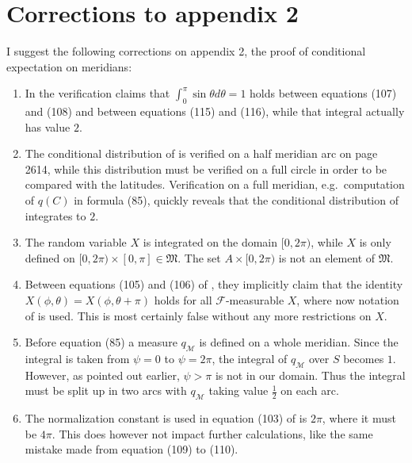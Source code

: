 \documentclass[a4paper]{report}
\theoremstyle{plain}
\theoremstyle{definition}
\theoremstyle{remark}
\numberwithin{equation}{chapter}
\DeclareMathOperator{\1}{\mathbbm{1}}
\newcommand{\F}{\mathcal{F}}
\begin{document}
\section{Corrections to appendix 2}\label{app:CorMer}
I suggest the following corrections on appendix 2, the proof of conditional expectation on meridians:
\begin{enumerate}
\item In the verification \cite{Gyenis17} claims that $\int_0^\pi\sin\theta d\theta=1$ holds between equations (107) and (108) and between equations (115) and (116), while that integral actually has value $2$.
\item The conditional distribution of \cite{Gyenis17} is verified on a half meridian arc on page 2614, while this distribution must be verified on a full circle in order to be compared with the latitudes. Verification on a full meridian, e.g.~computation of $q(C)$ in formula (85), quickly reveals that the conditional distribution of \cite{Gyenis17} integrates to $2$.
\item The random variable $X$ is integrated on the domain $[0,2\pi)$, while $X$ is only defined on $[0,2\pi)\times[0,\pi]\in\mathfrak{M}$. The set $A\times[0,2\pi)$ is not an element of $\mathfrak{M}$.
\item Between equations (105) and (106) of \cite{Gyenis17}, they implicitly claim that the identity $X(\phi,\theta)=X(\phi,\theta+\pi)$ holds for all $\F$-measurable $X$, where now notation of \cite{Gyenis17} is used. This is most certainly false without any more restrictions on $X$.
\item Before equation (85) a measure $q_\mathcal{M}$ is defined on a whole meridian. Since the integral is taken from $\psi=0$ to $\psi=2\pi$, the integral of $q_\mathcal{M}$ over $S$ becomes $1$. However, as pointed out earlier, $\psi>\pi$ is not in our domain. Thus the integral must be split up in two arcs with $q_{\mathcal{M}}$ taking value $\frac{1}{2}$ on each arc.
\item The normalization constant is used in equation (103) of \cite{Gyenis17} is $2\pi$, where it must be $4\pi$. This does however not impact further calculations, like the same mistake made from equation (109) to (110).
\end{enumerate}

\newpage

\printindex
\end{document}
